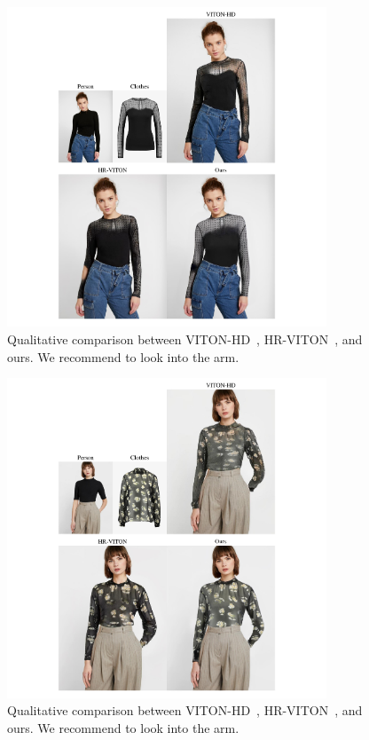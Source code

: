 \begin{figure}[t!]
    \centering
     \includegraphics[width=0.85\textwidth]{fig_supp/fig_suppl_HD_0.pdf}
     \caption{Qualitative comparison between VITON-HD~\cite{choi2021viton}, HR-VITON~\cite{lee2022hrviton}, and ours. We recommend to look into the arm.
     }
     \label{fig_supp_longsleeve_HR_3}
\end{figure}

\begin{figure}[t!]
    \centering
     \includegraphics[width=0.85\textwidth]{fig_supp/fig_suppl_HD_4.pdf}
     \caption{Qualitative comparison between VITON-HD~\cite{choi2021viton}, HR-VITON~\cite{lee2022hrviton}, and ours. We recommend to look into the arm.
     }
     \label{fig_supp_longsleeve_HR_4}
\end{figure}

